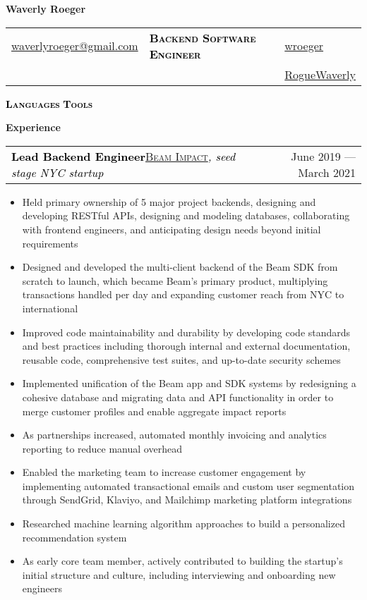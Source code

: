 \documentclass[letterpaper,11pt]{article}
\makeatletter
\newcommand{\boldsc}[1]{\textcolor{black}{\textbf{\textsc{#1}}}}
\newcommand{\resumeSpacing}{5pt}
\newcommand{\name}{Waverly Roeger}
\newcommand{\position}{Backend Software Engineer}
\newcommand{\addr}{\textcolor{black}{\faMapMarker}\space{New York City area (Stamford, CT)}}
\newcommand{\phone}{\textcolor{black}{\faPhone}\space{(806) 239-6854}}
\newcommand{\email}{\textcolor{black}{\faEnvelopeO}\space\href{mailto:waverlyroeger@gmail.com}{waverlyroeger@gmail.com}}
\newcommand{\linkedin}{\textcolor{black}{\faLinkedin}\space\href{https://www.linkedin.com/in/wroeger}{wroeger}}
\newcommand{\github}{\textcolor{black}{\faGithub}\space\href{https://github.com/RogueWaverly}{RogueWaverly}}
\newcommand{\resumeSection}[1]{
  \begin{flushleft}
  {\LARGE
  \textcolor{accent}{\textbf{#1}}
  \hrulefill}
  \end{flushleft}
}
\newcommand{\resumeSubsection}[5]{
  \begin{center}
	\begin{tabular*}{\textwidth}{l@{\extracolsep{\fill}}r}
	\large\textcolor{black}{\textbf{#1}}\normalsize\textcolor{black}{\quad\href{#4}{\textsc{#3}}\textit{#5}} & \small\textcolor{accent}{#2} \\
	\end{tabular*}
  \vspace{-\resumeSpacing}
  \vspace{-\resumeSpacing}
  \end{center}
}
\newenvironment{resumeItemize}{
  \addtolength{\leftmargini}{-\resumeSpacing}
  \begin{minipage}{0.99\textwidth}
  \begin{itemize}
  \small
}{
  \end{itemize}
  \vspace{0pt}
  \end{minipage}
  \normalsize
  \ \\
}
\newcommand{\resumeItem}[1]
{
  \raggedright
  \item{#1}
  \vspace{-\resumeSpacing}
}
\makeatother
\begin{document}
  \color{darkgray}
	\begin{center}\Huge{\color{black}\textbf{\name}}\end{center}
  \begin{center}
    \small
    {\setlength{\extrarowheight}{3pt}
    \begin{tabular*}{\textwidth}{L{0.25\textwidth}C{0.43\textwidth}R{0.25\textwidth}}
      \email & {\normalsize{\boldsc{\textcolor{accent}{\position}}}} & \linkedin \\
      \phone & \addr & \github \\
    \end{tabular*}}
  \end{center}
  \begin{center}
    \boldsc{Languages}{\small{}\quad}
    \boldsc{Tools}{\small{}}
  \end{center}
  \resumeSection{Experience}
  \resumeSubsection
  {Lead Backend Engineer}{June 2019 --- March 2021}
  {Beam Impact}{https://beamimpact.com/}{, seed stage NYC startup}
  \begin{resumeItemize}
    \resumeItem
    {Held primary ownership of 5 major project backends, designing and developing RESTful APIs, designing and modeling databases, collaborating with frontend engineers, and anticipating design needs beyond initial requirements}
    \resumeItem
    {Designed and developed the multi-client backend of the Beam SDK from scratch to launch, which became Beam's primary product, multiplying transactions handled per day and expanding customer reach from NYC to international}
    \resumeItem
    {Improved code maintainability and durability by developing code standards and best practices including thorough internal and external documentation, reusable code, comprehensive test suites, and up-to-date security schemes}
    \resumeItem
    {Implemented unification of the Beam app and SDK systems by redesigning a cohesive database and migrating data and API functionality in order to merge customer profiles and enable aggregate impact reports}
    \resumeItem
    {As partnerships increased, automated monthly invoicing and analytics reporting to reduce manual overhead}
    \resumeItem
    {Enabled the marketing team to increase customer engagement by implementing automated transactional emails and custom user segmentation through SendGrid, Klaviyo, and Mailchimp marketing platform integrations}
    \resumeItem
    {Researched machine learning algorithm approaches to build a personalized recommendation system}
    \resumeItem
    {As early core team member, actively contributed to building the startup's initial structure and culture, including interviewing and onboarding new engineers}
  \end{resumeItemize}
\end{document}
